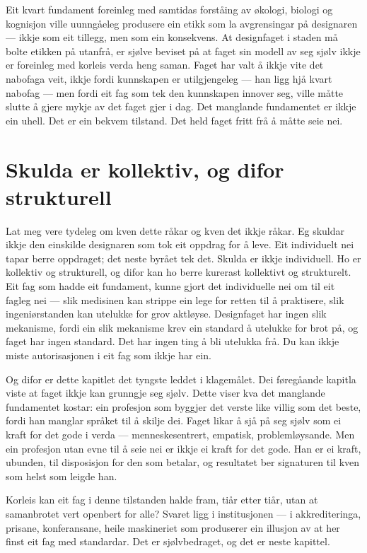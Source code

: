Eit kvart fundament foreinleg med samtidas forståing av økologi, biologi og kognisjon ville uunngåeleg produsere ein etikk som la avgrensingar på designaren — ikkje som eit tillegg, men som ein konsekvens. At designfaget i staden må bolte etikken på utanfrå, er sjølve beviset på at faget sin modell av seg sjølv ikkje er foreinleg med korleis verda heng saman. Faget har valt å ikkje vite det nabofaga veit, ikkje fordi kunnskapen er utilgjengeleg — han ligg hjå kvart nabofag — men fordi eit fag som tek den kunnskapen innover seg, ville måtte slutte å gjere mykje av det faget gjer i dag. Det manglande fundamentet er ikkje ein uhell. Det er ein bekvem tilstand. Det held faget fritt frå å måtte seie nei.

\section{Skulda er kollektiv, og difor strukturell}

Lat meg vere tydeleg om kven dette råkar og kven det ikkje råkar. Eg skuldar ikkje den einskilde designaren som tok eit oppdrag for å leve. Eit individuelt nei tapar berre oppdraget; det neste byrået tek det. Skulda er ikkje individuell. Ho er kollektiv og strukturell, og difor kan ho berre kurerast kollektivt og strukturelt. Eit fag som hadde eit fundament, kunne gjort det individuelle nei om til eit fagleg nei — slik medisinen kan strippe ein lege for retten til å praktisere, slik ingeniørstanden kan utelukke for grov aktløyse. Designfaget har ingen slik mekanisme, fordi ein slik mekanisme krev ein standard å utelukke for brot på, og faget har ingen standard. Det har ingen ting å bli utelukka frå. Du kan ikkje miste autorisasjonen i eit fag som ikkje har ein.

Og difor er dette kapitlet det tyngste leddet i klagemålet. Dei føregåande kapitla viste at faget ikkje kan grunngje seg sjølv. Dette viser kva det manglande fundamentet kostar: ein profesjon som byggjer det verste like villig som det beste, fordi han manglar språket til å skilje dei. Faget likar å sjå på seg sjølv som ei kraft for det gode i verda — menneskesentrert, empatisk, problemløysande. Men ein profesjon utan evne til å seie nei er ikkje ei kraft for det gode. Han er ei kraft, ubunden, til disposisjon for den som betalar, og resultatet ber signaturen til kven som helst som leigde han.

\vignett

Korleis kan eit fag i denne tilstanden halde fram, tiår etter tiår, utan at samanbrotet vert openbert for alle? Svaret ligg i institusjonen — i akkrediteringa, prisane, konferansane, heile maskineriet som produserer ein illusjon av at her finst eit fag med standardar. Det er sjølvbedraget, og det er neste kapittel.
